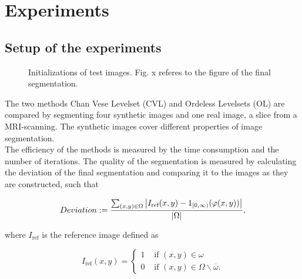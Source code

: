 
\chapter{Experiments}\label{chapter:experiments}
\section{Setup of the experiments}\label{section:setupex}
\begin{figure}[h]
  \centering
  \caption{Initializations of test images. Fig. x referes to the figure of the final segmentation.}
\end{figure}

The two methods Chan Vese Levelset (CVL) and Ordeless Levelsets (OL) are compared by segmenting four synthetic images and one real image, a slice from a MRI-scanning. The synthetic images cover different properties of image segmentation.\\
The efficiency of the methods is measured by the time consumption and the number of iterations. The quality of the segmentation is measured by calculating the deviation of the final segmentation and comparing it to the images as they are constructed, such that 

\begin{equation}
  Deviation := \frac{\sum_{(x,y)\in\Omega}\left| {I_{\text{ref}}(x,y)-1_{[0,\infty)}(\varphi(x,y))} \right|}{\left| {\Omega} \right|},
\end{equation}

where $I_{\text{ref}}$ is the reference image defined as

\begin{equation}
  I_{\text{ref}}(x,y) = \begin{cases}
    1 & \mbox{ if } (x,y)\in \omega\\
    0 & \mbox{ if } (x,y)\in \Omega\backslash\overline{\omega}.
  \end{cases}
\end{equation}

